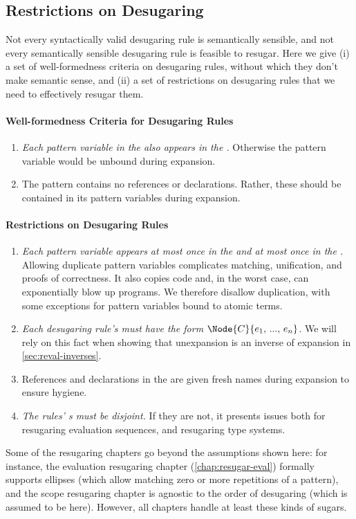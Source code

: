 \subsection{Restrictions on Desugaring}\label{sec:formal-reqs}

Not every syntactically valid desugaring rule is semantically
sensible, and not every semantically sensible desugaring rule is
feasible to resugar. Here we give (i) a set of well-formedness
criteria on desugaring rules, without which they don't make semantic
sense, and (ii) a set of restrictions on desugaring rules that we need
to effectively resugar them.

\paragraph{Well-formedness Criteria for Desugaring Rules}
\begin{enumerate}
\item \emph{Each pattern variable in the  also appears in the
  .} Otherwise the pattern variable would be unbound during
  expansion.
\item The  pattern contains no references or declarations. Rather, these
  should be contained in its pattern variables during expansion.
\end{enumerate}

\paragraph{Restrictions on Desugaring Rules}
\begin{enumerate}
\item \emph{Each pattern variable appears at most once in the  and at
  most once in the .}
  Allowing duplicate pattern variables complicates matching, unification,
  and proofs of correctness. It also copies code
  and, in the worst case, can exponentially blow up programs.
  We therefore disallow duplication,
  with some exceptions for pattern variables bound to atomic terms.
\item \emph{Each desugaring rule's  must have the form
  $\Node{C}{e_1,\,...,\,e_n}$.} We will rely on this fact when showing that
  unexpansion is an inverse of expansion in \cref{sec:reval-inverses}.
\item References and declarations in the  are given fresh names during
  expansion to ensure hygiene.
\item \emph{The rules' s must be disjoint.} If they
  are not, it presents issues both for resugaring evaluation sequences,
  and resugaring type systems.
\end{enumerate}

Some of the resugaring chapters go beyond the assumptions shown here: for instance, the
evaluation resugaring chapter (\cref{chap:resugar-eval}) formally
supports ellipses (which allow matching zero or more repetitions of a
pattern), and the scope resugaring chapter is agnostic to the order of
desugaring (which is assumed to be  here). However, all
chapters handle at least these kinds of sugars.
